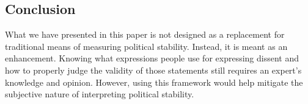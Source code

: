 \documentclass[12pt]{article}
\begin{document}
\begin{spacing}{1.5}
\section*{Conclusion}

What we have presented in this paper is not designed as a replacement for traditional means of measuring political stability. Instead, it is meant as an enhancement. Knowing what expressions people use for expressing dissent and how to properly judge the validity of those statements still requires an expert's knowledge and opinion. However, using this framework would help mitigate the subjective nature of interpreting political stability. 





\end{spacing}

\pagebreak




\nocite{*}
\end{document}
